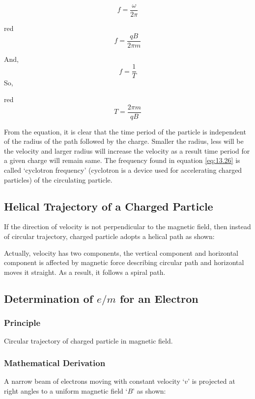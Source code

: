 \begin{equation}\nonumber
    f=\frac{\omega}{2\pi}
\end{equation}
\begin{mybox}{red}{}
\begin{equation}\label{eq:13.26}
    f=\frac{qB}{2 \pi m}
\end{equation}
\end{mybox}
\noindent And,
\begin{equation}\nonumber
    f=\frac{1}{T}
\end{equation}
So,
\begin{mybox}{red}{}
\begin{equation}
    T=\frac{2\pi m}{qB}
\end{equation}
\end{mybox}

From the equation, it is clear that the time period of the particle is independent of the radius of the path followed by the charge. Smaller the radius, less will be the velocity and larger radius will increase the velocity as a result time period for a given charge will remain same.
The frequency found in equation \ref{eq:13.26} is called ‘cyclotron frequency’ (cyclotron is a device used for accelerating charged particles) of the circulating particle.
\subsection{Helical Trajectory of a Charged Particle}
If the direction of velocity is not perpendicular to the magnetic field, then instead of circular trajectory, charged particle adopts a helical path as shown:

Actually, velocity has two components, the vertical component and horizontal component is affected by magnetic force describing circular path and horizontal  moves it straight. As a result, it follows a spiral path.
\subsection{Determination of $e/m$ for an Electron}
\subsubsection{Principle}
Circular trajectory of charged particle in magnetic field.
\subsubsection{Mathematical Derivation}
A narrow beam of electrons moving with constant velocity ‘$v$’ is projected at right angles to a uniform magnetic field ‘$B$’ as shown:

